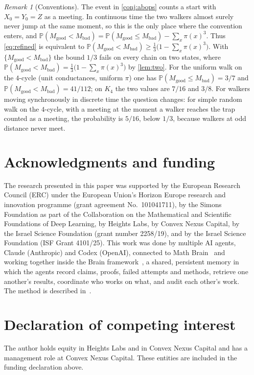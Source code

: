 \documentclass[11pt,a4paper]{article}
\numberwithin{equation}{section}
\theoremstyle{remark}
\newtheorem{remark}[theorem]{Remark}
\newcommand{\Pp}{\mathbb P}
\newcommand{\good}{M_{\mathrm{good}}}
\newcommand{\bad}{M_{\mathrm{bad}}}
\begin{document}
\begin{remark}[Conventions]\label{rem:conv}
The event in \cref{conj:abops} counts a start with $X_0=Y_0=Z$ as a meeting. In continuous time the two walkers almost surely never jump at the same moment, so this is the only place where the convention enters, and $\Pp(\good<\bad)=\Pp(\good\le\bad)-\sum_x\pi(x)^3$. Thus \eqref{eq:refined} is equivalent to $\Pp(\good<\bad)\ge\frac13\bigl(1-\sum_x\pi(x)^3\bigr)$. With $\{\good<\bad\}$ the bound $1/3$ fails on every chain on two states, where $\Pp(\good<\bad)=\frac13\bigl(1-\sum_x\pi(x)^3\bigr)$ by \cref{lem:two}. For the uniform walk on the $4$-cycle (unit conductances, uniform $\pi$) one has $\Pp(\good\le\bad)=3/7$ and $\Pp(\good<\bad)=41/112$; on $K_4$ the two values are $7/16$ and $3/8$. For walkers moving synchronously in discrete time the question changes: for simple random walk on the $4$-cycle, with a meeting at the moment a walker reaches the trap counted as a meeting, the probability is $5/16$, below $1/3$, because walkers at odd distance never meet.
\end{remark}

\section*{Acknowledgments and funding}
The research presented in this paper was supported by the European Research Council (ERC) under the European Union's Horizon Europe research and innovation programme (grant agreement No.~101041711), by the Simons Foundation as part of the Collaboration on the Mathematical and Scientific Foundations of Deep Learning, by Heights Labs, by Convex Nexus Capital, by the Israel Science Foundation (grant number 2258/19), and by the Israel Science Foundation (ISF Grant 4101/25).
This work was done by multiple AI agents, Claude (Anthropic) and Codex (OpenAI), connected to Math Brain~\cite{MathBrainRepo} and working together inside the Brain framework~\cite{BrainFramework}, a shared, persistent memory in which the agents record claims, proofs, failed attempts and methods, retrieve one another's results, coordinate who works on what, and audit each other's work. The method is described in~\cite{MathBrainPaper}.

\section*{Declaration of competing interest}
The author holds equity in Heights Labs and in Convex Nexus Capital and has a management role at Convex Nexus Capital. These entities are included in the funding declaration above.
\end{document}
